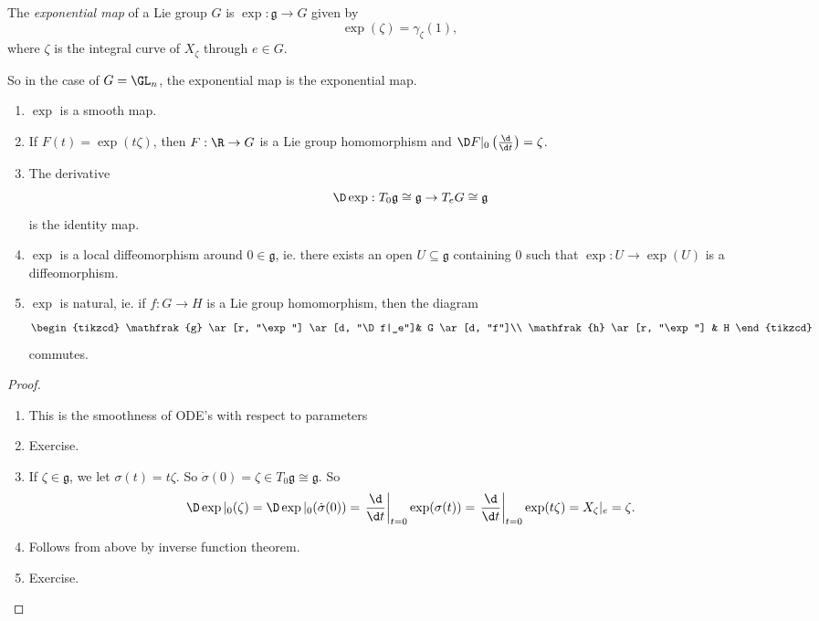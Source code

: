 \documentclass[a4paper]{article}
\begin{document}
\begin{defi}
  The \emph{exponential map} of a Lie group $G$ is $\exp: \mathfrak{g} \to G$ given by
  \[
    \exp(\zeta) = \gamma_\zeta(1),
  \]
  where $\zeta$ is the integral curve of $X_\zeta$ through $e \in G$.
\end{defi}
So in the case of $G = \GL_n$, the exponential map is the exponential map.

\begin{prop}\leavevmode
  \begin{enumerate}
    \item $\exp$ is a smooth map.
    \item If $F(t) = \exp(t\zeta)$, then $F: \R \to G$ is a Lie group homomorphism and $\D F|_0 \left(\frac{\d}{\d t}\right) = \zeta$.
    \item The derivative
      \[
        \D \exp: T_0 \mathfrak{g} \cong \mathfrak{g} \to T_e G \cong \mathfrak{g}
      \]
      is the identity map.
    \item $\exp$ is a local diffeomorphism around $0 \in \mathfrak{g}$, ie. there exists an open $U \subseteq \mathfrak{g}$ containing $0$ such that $\exp: U \to \exp(U)$ is a diffeomorphism.
    \item $\exp$ is natural, ie. if $f: G \to H$ is a Lie group homomorphism, then the diagram
      \[
        \begin{tikzcd}
          \mathfrak{g} \ar[r, "\exp"] \ar[d, "\D f|_e"]& G \ar[d, "f"]\\
          \mathfrak{h} \ar[r, "\exp"] & H
        \end{tikzcd}
      \]
      commutes.
  \end{enumerate}
\end{prop}

\begin{proof}\leavevmode
  \begin{enumerate}
    \item This is the smoothness of ODE's with respect to parameters
    \item Exercise.
    \item If $\zeta \in \mathfrak{g}$, we let $\sigma(t) = t \zeta$. So $\dot{\sigma}(0) = \zeta \in T_0 \mathfrak{g} \cong \mathfrak{g}$. So
      \[
        \D \exp|_0 (\zeta) = \D \exp|_0(\dot{\sigma}(0)) = \left.\frac{\d}{\d t}\right|_{t = 0} \exp(\sigma(t)) = \left.\frac{\d}{\d t}\right|_{t = 0} \exp(t \zeta) = X_\zeta|_e = \zeta.
      \]
    \item Follows from above by inverse function theorem.
    \item Exercise.
  \end{enumerate}
\end{proof}
\end{document}
